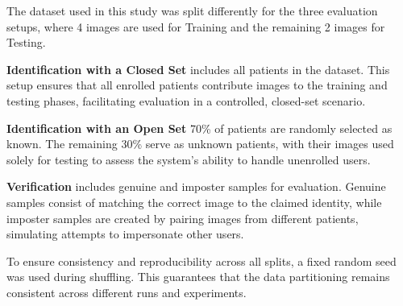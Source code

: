 The dataset used in this study was split differently for the three evaluation setups, where 4 images are used for Training and the remaining 2 images for Testing.

\textbf{Identification with a Closed Set} includes all patients in the dataset. This setup ensures that all enrolled patients contribute images to the training and testing phases, facilitating evaluation in a controlled, closed-set scenario.

\textbf{Identification with an Open Set} 70\% of patients are randomly selected as known. The remaining 30\% serve as unknown patients, with their images used solely for testing to assess the system's ability to handle unenrolled users. 

\textbf{Verification} includes genuine and imposter samples for evaluation. Genuine samples consist of matching the correct image to the claimed identity, while imposter samples are created by pairing images from different patients, simulating attempts to impersonate other users. 

To ensure consistency and reproducibility across all splits, a fixed random seed was used during shuffling. This guarantees that the data partitioning remains consistent across different runs and experiments.